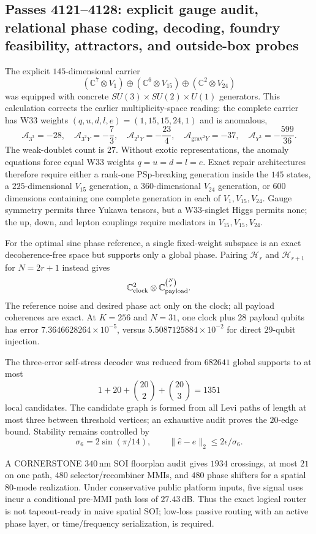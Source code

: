 \subsection{Passes 4121--4128: explicit gauge audit, relational phase coding, decoding, foundry feasibility, attractors, and outside-box probes}
\label{sec:passes4121-4128}

The explicit $145$-dimensional carrier
\[
(\mathbb C^7\!\otimes V_1)\oplus(\mathbb C^6\!\otimes V_{15})\oplus(\mathbb C^2\!\otimes V_{24})
\]
was equipped with concrete $SU(3)\times SU(2)\times U(1)$ generators.  This calculation corrects the earlier multiplicity-space reading: the complete carrier has W33 weights $(q,u,d,l,e)=(1,15,15,24,1)$ and is anomalous,
\[
\mathcal A_{3^3}=-28,\quad \mathcal A_{3^2Y}=-\frac73,
\quad \mathcal A_{2^2Y}=-\frac{23}{4},\quad
\mathcal A_{\mathrm{grav}^2Y}=-37,\quad \mathcal A_{Y^3}=-\frac{599}{36}.
\]
The weak-doublet count is $27$.  Without exotic representations, the anomaly equations force equal W33 weights $q=u=d=l=e$.  Exact repair architectures therefore require either a rank-one PSp-breaking generation inside the $145$ states, a $225$-dimensional $V_{15}$ generation, a $360$-dimensional $V_{24}$ generation, or $600$ dimensions containing one complete generation in each of $V_1,V_{15},V_{24}$.  Gauge symmetry permits three Yukawa tensors, but a W33-singlet Higgs permits none; the up, down, and lepton couplings require mediators in $V_{15},V_{15},V_{24}$.

For the optimal sine phase reference, a single fixed-weight subspace is an exact decoherence-free space but supports only a global phase.  Pairing $\mathcal H_r$ and $\mathcal H_{r+1}$ for $N=2r+1$ instead gives
\[
\mathbb C^2_{\rm clock}\otimes\mathbb C^{\binom Nr}_{\rm payload}.
\]
The reference noise and desired phase act only on the clock; all payload coherences are exact.  At $K=256$ and $N=31$, one clock plus $28$ payload qubits has error $7.3646628264\times10^{-5}$, versus $5.5087125884\times10^{-2}$ for direct $29$-qubit injection.

The three-error self-stress decoder was reduced from $682641$ global supports to at most
\[
1+20+\binom{20}{2}+\binom{20}{3}=1351
\]
local candidates.  The candidate graph is formed from all Levi paths of length at most three between threshold vertices; an exhaustive audit proves the $20$-edge bound.  Stability remains controlled by
\[
\sigma_6=2\sin(\pi/14),\qquad \|\widehat e-e\|_2\le 2\epsilon/\sigma_6.
\]

A CORNERSTONE $340\,$nm SOI floorplan audit gives $1934$ crossings, at most $21$ on one path, $480$ selector/recombiner MMIs, and $480$ phase shifters for a spatial $80$-mode realization.  Under conservative public platform inputs, five signal uses incur a conditional pre-MMI path loss of $27.43\,$dB.  Thus the exact logical router is not tapeout-ready in naive spatial SOI; low-loss passive routing with an active phase layer, or time/frequency serialization, is required.

